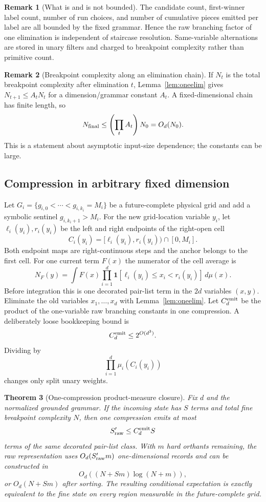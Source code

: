 \documentclass[12pt,a4paper]{article}
\newtheorem{theorem}{Theorem}
\theoremstyle{definition}
\newtheorem{remark}[theorem]{Remark}
\newcommand{\1}{\mathbf 1}
\begin{document}
\begin{remark}[What is and is not bounded]
The candidate count, first-winner label count, number of run choices, and number of cumulative pieces emitted per label are all bounded by the fixed grammar. Hence the raw branching factor of one elimination is independent of staircase resolution. Same-variable alternations are stored in unary filters and charged to breakpoint complexity rather than primitive count.
\end{remark}

\begin{remark}[Breakpoint complexity along an elimination chain]
If $N_t$ is the total breakpoint complexity after elimination $t$, Lemma~\ref{lem:oneelim} gives $N_{t+1}\le A_tN_t$ for a dimension/grammar constant $A_t$. A fixed-dimensional chain has finite length, so
\[
N_{\rm final}\le\left(\prod_tA_t\right)N_0=O_d(N_0).
\]
This is a statement about asymptotic input-size dependence; the constants can be large.
\end{remark}

\subsection{Compression in arbitrary fixed dimension}

Let $G_i=\{g_{i,0}<\cdots<g_{i,k_i}=M_i\}$ be a future-complete physical grid and add a symbolic sentinel $g_{i,k_i+1}>M_i$. For the new grid-location variable $y_i$, let $\ell_i(y_i),r_i(y_i)$ be the left and right endpoints of the right-open cell
\[
C_i(y_i)=[\ell_i(y_i),r_i(y_i))\cap[0,M_i].
\]
Both endpoint maps are right-continuous steps and the anchor belongs to the first cell. For one current term $F(x)$ the numerator of the cell average is
\begin{equation}
N_F(y)=\int F(x)\prod_{i=1}^d
\mathbf1[\ell_i(y_i)\le x_i<r_i(y_i)]\,d\mu(x).       \label{eq:generalcompression}
\end{equation}
Before integration this is one decorated pair-list term in the $2d$ variables $(x,y)$. Eliminate the old variables $x_1,\ldots,x_d$ with Lemma~\ref{lem:oneelim}. Let $C_d^{\rm emit}$ be the product of the one-variable raw branching constants in one compression. A deliberately loose bookkeeping bound is
\[
C_d^{\rm emit}\le2^{O(d^3)}.
\]
Dividing by
\[
\prod_{i=1}^d\mu_i(C_i(y_i))
\]
changes only split unary weights.

\begin{theorem}[One-compression product-measure closure]       \label{thm:generalsimplification}
Fix $d$ and the normalized grounded grammar. If the incoming state has $S$ terms and total fine breakpoint complexity $N$, then one compression emits at most
\[
S_{\rm raw}'\le C_d^{\rm emit}S
\]
terms of the same decorated pair-list class. With $m$ hard orthants remaining, the raw representation uses $O_d(S_{\rm raw}'m)$ one-dimensional records and can be constructed in
\[
O_d\!\left((N+Sm)\log(N+m)\right),
\]
or $O_d(N+Sm)$ after sorting. The resulting conditional expectation is exactly equivalent to the fine state on every region measurable in the future-complete grid.
\end{theorem}
\end{document}
